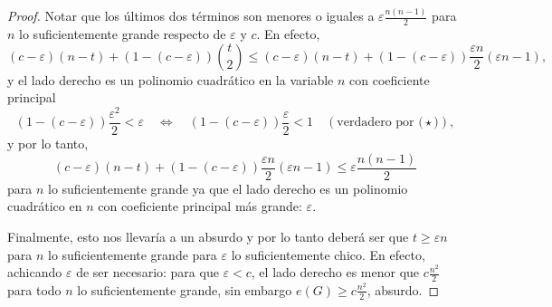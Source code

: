 \documentclass[12pt]{report}
\theoremstyle{plain}
\theoremstyle{definition}
\begin{document}
\begin{proof}
Notar que los últimos dos términos son menores o iguales a $\varepsilon \frac{n (n-1)}{2}$ para $n$ lo suficientemente grande respecto de $\varepsilon$ y $c$. En efecto,
\[
(c - \varepsilon)(n - t) + (1 - (c - \varepsilon)) \binom t 2 \leq (c - \varepsilon ) (n-t) + (1 - (c - \varepsilon ) ) \frac{\varepsilon n}{2} (\varepsilon n - 1),
\]
y el lado derecho es un polinomio cuadrático en la variable $n$ con coeficiente principal
\[
(1 - (c - \varepsilon ) ) \frac{\varepsilon^2}{2} < \varepsilon \quad \Leftrightarrow \quad (1 - (c - \varepsilon ) ) \frac{\varepsilon}{2} < 1  \quad (\text{verdadero por ($\star$)}),
\]
y por lo tanto,
\[
(c - \varepsilon ) (n-t) + (1 - (c - \varepsilon ) ) \frac{\varepsilon n}{2} (\varepsilon n - 1) \leq \varepsilon \frac{n (n-1)} 2
\]
para $n$  lo suficientemente grande ya que el lado derecho es un polinomio cuadrático en $n$ con coeficiente principal más grande: $\varepsilon$.

Finalmente, esto nos llevaría a un absurdo y por lo tanto deberá ser que $t \geq \varepsilon n$ para $n$ lo suficientemente grande para $\varepsilon$ lo suficientemente chico. En efecto, achicando $\varepsilon$ de ser necesario: para que $\varepsilon < c$, el lado derecho es menor que $ c \frac {n^2} 2$ para todo $n$ lo suficientemente grande, sin embargo $e(G) \geq c \frac{n^2}{2}$, absurdo.
\end{proof}
\end{document}
